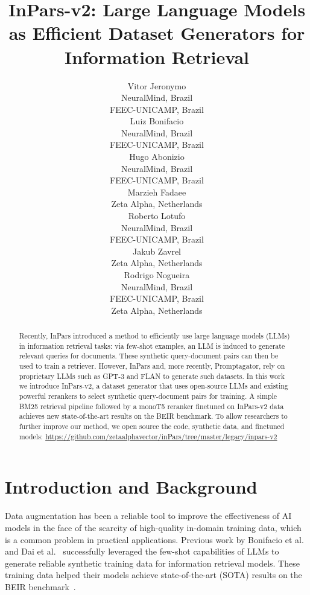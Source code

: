 \documentclass{article}
\title{InPars-v2: Large Language Models as Efficient Dataset Generators for Information Retrieval}
\author{Vitor Jeronymo\\
NeuralMind, Brazil\\
FEEC-UNICAMP, Brazil \\\And
Luiz Bonifacio \\
NeuralMind, Brazil\\
FEEC-UNICAMP, Brazil \\ \And
Hugo Abonizio\\
NeuralMind, Brazil\\
FEEC-UNICAMP, Brazil \\\AND
Marzieh Fadaee \\
Zeta Alpha, Netherlands \\\And
Roberto Lotufo\\
NeuralMind, Brazil\\
FEEC-UNICAMP, Brazil \\\And 
Jakub Zavrel \\
Zeta Alpha, Netherlands \\\And
Rodrigo Nogueira \\
NeuralMind, Brazil \\
FEEC-UNICAMP, Brazil \\
Zeta Alpha, Netherlands
}
\begin{document}
\maketitle







\begin{abstract}
  Recently, InPars introduced a method to efficiently use large language models (LLMs) in information retrieval tasks: via few-shot examples, an LLM is induced to generate relevant queries for documents. These synthetic query-document pairs can then be used to train a retriever. However, InPars and, more recently, Promptagator, rely on proprietary LLMs such as GPT-3 and FLAN to generate such datasets. In this work we introduce InPars-v2, a dataset generator that uses open-source LLMs and existing powerful rerankers to select synthetic query-document pairs for training. A simple BM25 retrieval pipeline followed by a monoT5 reranker finetuned on InPars-v2 data achieves new state-of-the-art results on the BEIR benchmark. To allow researchers to further improve our method, we open source the code, synthetic data, and finetuned models: \url{https://github.com/zetaalphavector/inPars/tree/master/legacy/inpars-v2}
\end{abstract}


\section{Introduction and Background}

Data augmentation has been a reliable tool to improve the effectiveness of AI models in the face of the scarcity of high-quality in-domain training data, which is a common problem in practical applications.
Previous work by Bonifacio et al.~\cite{bonifacio2022inpars} and Dai et al.~\cite{dai2022promptagator} successfully leveraged the few-shot capabilities of LLMs to generate reliable synthetic training data for information retrieval models. These training data helped their models achieve state-of-the-art (SOTA) results on the BEIR benchmark~\cite{beir}.
\end{document}
